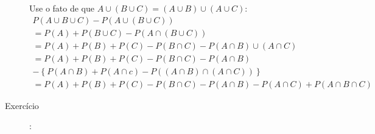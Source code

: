 \documentclass[11pt,a4paper]{book}
\begin{document}
\begin{description}
    Use o fato de que $A\cup (B \cup C )= (A\cup B )\cup (A \cup C )$:
    \begin{align*}
      P\left(A\cup B\cup C \right)- P\left(A \cup \left(B \cup C\right) \right)\\
      =P(A)+P(B\cup C)- P\left(A\cap \left(B\cup C \right) \right)\\
      =P(A)+P(B)+P(C)-P(B\cap C)- P(A \cap B)\cup (A \cap C)\\
      =P(A)+P(B)+P(C)-P(B\cap C)- P(A \cap B) \\ -\left\{ P \left(A \cap B \right)+ P\left(A \cap c \right)-P\left(\left(A \cap B \right) \cap \left(A \cap C \right) \right) \right\} \\
      =P(A)+P(B)+P(C)-P(B\cap C)- P(A \cap B)- P(A \cap C)+ P(A \cap B \cap C)
    \end{align*}

  \item [Exercício]: 


\end{description}
\end{document}

